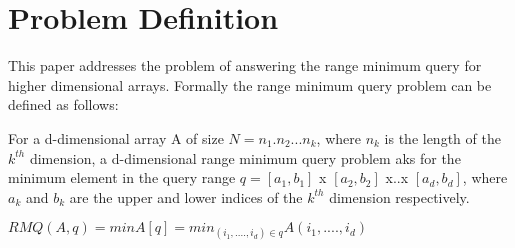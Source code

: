 \section{Problem Definition}
This paper\cite{p10} addresses the problem of answering the range minimum query for higher dimensional arrays. Formally the range minimum query problem can be defined as follows:\par
For a d-dimensional array A of size $N = n_1.n_2...n_k$, where $n_k$ is the length of the $k^{th}$ dimension, a d-dimensional range minimum query problem aks for the minimum element in the query range $q = [a_1, b_1]$ x $[a_2, b_2]$ x..x $[a_d, b_d]$, where $a_k$ and $b_k$ are the upper and lower indices of the $k^{th}$ dimension respectively.
\begin{center}
\begin{math}
RMQ(A, q) = min A[q] = min_{(i_1,....,i_d)\in q}  A(i_1,....,i_d)
\end{math}
\end{center}
